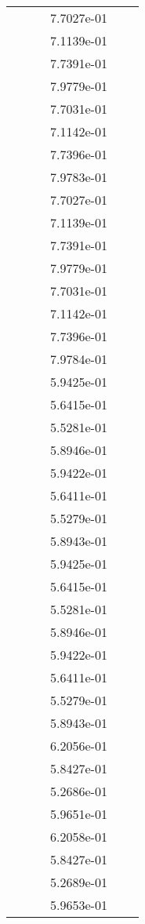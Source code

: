 \begin{xltabular}{\textwidth}{r|rS[table-format=1.3e+2]S[table-format=1.4e+2]S[table-format=1.4e+2]S[table-format=-1.5]}
&  &  & 7.7027e-01 & & \\
&  &  & 7.1139e-01 & & \\
&  &  & 7.7391e-01 & & \\
&  &  & 7.9779e-01 & & \\
&  &  & 7.7031e-01 & & \\
&  &  & 7.1142e-01 & & \\
&  &  & 7.7396e-01 & & \\
&  &  & 7.9783e-01 & & \\
&  &  & 7.7027e-01 & & \\
&  &  & 7.1139e-01 & & \\
&  &  & 7.7391e-01 & & \\
&  &  & 7.9779e-01 & & \\
&  &  & 7.7031e-01 & & \\
&  &  & 7.1142e-01 & & \\
&  &  & 7.7396e-01 & & \\
&  &  & 7.9784e-01 & & \\
&  &  & 5.9425e-01 & & \\
&  &  & 5.6415e-01 & & \\
&  &  & 5.5281e-01 & & \\
&  &  & 5.8946e-01 & & \\
&  &  & 5.9422e-01 & & \\
&  &  & 5.6411e-01 & & \\
&  &  & 5.5279e-01 & & \\
&  &  & 5.8943e-01 & & \\
&  &  & 5.9425e-01 & & \\
&  &  & 5.6415e-01 & & \\
&  &  & 5.5281e-01 & & \\
&  &  & 5.8946e-01 & & \\
&  &  & 5.9422e-01 & & \\
&  &  & 5.6411e-01 & & \\
&  &  & 5.5279e-01 & & \\
&  &  & 5.8943e-01 & & \\
&  &  & 6.2056e-01 & & \\
&  &  & 5.8427e-01 & & \\
&  &  & 5.2686e-01 & & \\
&  &  & 5.9651e-01 & & \\
&  &  & 6.2058e-01 & & \\
&  &  & 5.8427e-01 & & \\
&  &  & 5.2689e-01 & & \\
&  &  & 5.9653e-01 & & \\

\end{xltabular}
